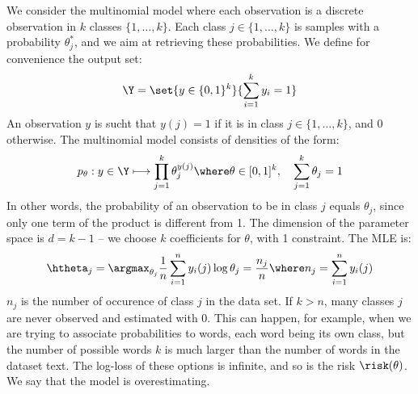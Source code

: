 \documentclass[toc, titlepaged]{../cs-classes/cs-classes}
\begin{document}
\begin{example}
    We consider the multinomial model where each observation is a discrete observation in $k$ classes $\{1, \dots, k\}$. Each class $j\in\{1, \dots, k\}$ is samples with a probability $\theta^*_j$, and we aim at retrieving these probabilities. We define for convenience the output set:
    \begin{equation*}
        \Y=\set{y\in\{0, 1\}^k}{\sum_{i=1}^ky_i=1}
    \end{equation*}
    An observation $y$ is sucht that $y(j)=1$ if it is in class $j\in\{1, \dots, k\}$, and 0 otherwise. The multinomial model consists of densities of the form:
    \begin{equation*}
        p_\theta : y\in\Y\longmapsto\prod_{j=1}^k\theta_j^{y(j)} \where \theta\in[0, 1]^k, \quad \sum_{j=1}^k\theta_j=1
    \end{equation*} 
    In other words, the probability of an observation to be in class $j$ equals $\theta_j$, since only one term of the product is different from 1. The dimension of the parameter space is $d=k-1$ --  we choose $k$ coefficients for $\theta$, with 1 constraint. The MLE is:
    \begin{equation*}
        \htheta_j = \argmax_{\theta_j} \frac{1}{n}\sum_{i=1}^n y_i(j)\log\theta_j = \frac{n_j}{n} \where n_j = \sum_{i=1}^n y_i(j)
    \end{equation*}
    $n_j$ is the number of occurence of class $j$ in the data set. If $k>n$, many classes $j$ are never observed and estimated with 0. This can happen, for example, when we are trying to associate probabilities to words, each word being its own class, but the number of possible words $k$ is much larger than the number of words in the dataset text. The log-loss of these options is infinite, and so is the risk $\risk(\theta)$. We say that the model is overestimating.
\end{example}
\end{document}
